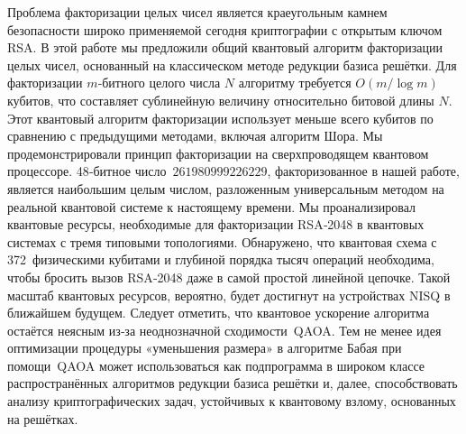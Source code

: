 \conclusion

Проблема факторизации целых чисел является краеугольным камнем безопасности
широко применяемой сегодня криптографии с открытым ключом RSA. В этой работе мы
предложили общий квантовый алгоритм факторизации целых чисел, основанный на
классическом методе редукции базиса решётки. Для факторизации $m$‑битного
целого числа $N$ алгоритму требуется $O(m/\log m)$ кубитов, что составляет
сублинейную величину относительно битовой длины $N$. Этот квантовый алгоритм
факторизации использует меньше всего кубитов по сравнению с предыдущими
методами, включая алгоритм Шора. Мы продемонстрировали принцип факторизации на
сверхпроводящем квантовом процессоре. 48‑битное число $261980999226229$,
факторизованное в нашей работе, является наибольшим целым числом, разложенным
универсальным методом на реальной квантовой системе к настоящему времени. Мы
проанализи­ровал квантовые ресурсы, необходимые для факторизации RSA‑2048 в
квантовых системах с тремя типовыми топологиями. Обнаружено, что квантовая
схема с 372 физическими кубитами и глубиной порядка тысяч операций необходима,
чтобы бросить вызов RSA‑2048 даже в самой простой линейной цепочке. Такой
масштаб квантовых ресурсов, вероятно, будет достигнут на устройствах NISQ в
ближайшем будущем. Следует отметить, что квантовое ускорение алгоритма остаётся
неясным из‑за неоднозначной сходимости QAOA. Тем не менее идея оптимизации
процедуры «уменьшения размера» в алгоритме Бабая при помощи QAOA может
использоваться как подпрограмма в широком классе распространённых алгоритмов
редукции базиса решётки и, далее, способствовать анализу криптографических
задач, устойчивых к квантовому взлому, основанных на решётках.
